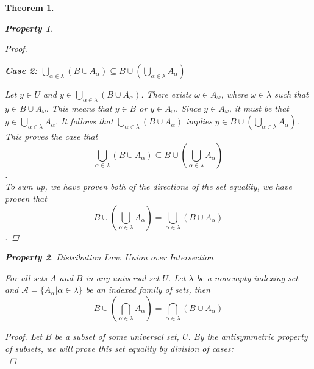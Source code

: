 \documentclass{book}
\newtheorem{theorem}{Theorem}[section]
\newtheorem{property}{Property}[theorem]
\theoremstyle{definition}
\theoremstyle{remark}
\newcommand{\cc}[1]{\mathcal{#1}}
\begin{document}
\begin{theorem}
\begin{property}
\begin{proof}
            \begin{flushleft} \textbf{Case 2: $\bigcup_{\alpha \in \lambda}{(B \cup A_{\alpha})} \subseteq B \cup \left ( \bigcup_{\alpha \in \lambda}{A_{\alpha}} \right )$} \end{flushleft} 
                Let $y \in U$ and $y \in \bigcup_{\alpha \in \lambda}{(B \cup A_{\alpha})}$. There exists $\omega \in A_{\omega}$, where $\omega \in \lambda$ such that $y \in B \cup A_{\omega}$. This means that $y \in B$ or $y \in A_{\omega}$. Since $y \in A_{\omega}$, it must be that $y \in \bigcup_{\alpha \in \lambda}{A_{\alpha}}$. It follows that $\bigcup_{\alpha \in \lambda}{(B \cup A_{\alpha})}$ implies $y \in B \cup \left ( \bigcup_{\alpha \in \lambda}{A_{\alpha}} \right )$. This proves the case that $$\bigcup_{\alpha \in \lambda}{(B \cup A_{\alpha})} \subseteq B \cup \left ( \bigcup_{\alpha \in \lambda}{A_{\alpha}} \right )$$. \\
                
            To sum up, we have proven both of the directions of the set equality, we have proven that $$B \cup \left ( \bigcup_{\alpha \in \lambda}{A_{\alpha}} \right ) = \bigcup_{\alpha \in \lambda}{(B \cup A_{\alpha})}$$. 
        \end{proof}
    \end{property}
    
    \newpage
    \begin{property}
    Distribution Law: Union over Intersection \\
        \begin{tcolorbox}
            For all sets $A$ and $B$ in any universal set $U$. Let $\lambda$ be a nonempty indexing set and $\cc{A} = \{ A_{\alpha} | \alpha \in \lambda \}$ be an indexed family of sets, then
                \begin{equation*}
                    B \cup \left ( \bigcap_{\alpha \in \lambda}{A_{\alpha}} \right ) = \bigcap_{\alpha \in \lambda}{(B \cup A_{\alpha})}
                \end{equation*}
        \end{tcolorbox}
    
        \begin{proof}
            Let $B$ be a subset of some universal set, $U$. By the antisymmetric property of subsets, we will prove this set equality by division of cases: \\
            

\end{proof}
\end{property}
\end{theorem}
\end{document}
